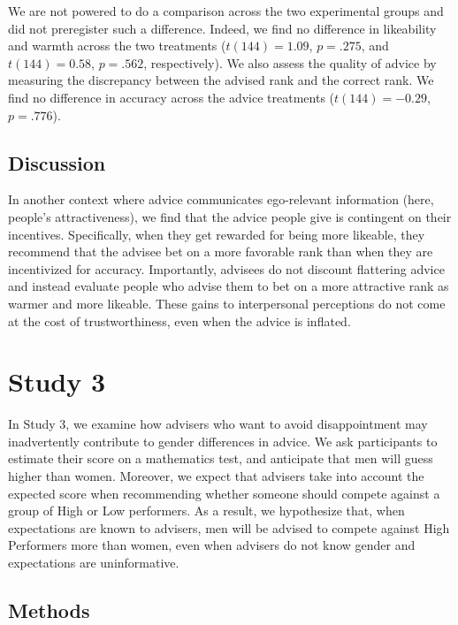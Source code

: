 \documentclass[
  man,
  floatsintext,
  longtable,
  nolmodern,
  notxfonts,
  notimes,
  colorlinks=true,linkcolor=blue,citecolor=blue,urlcolor=blue]{apa7}
\begin{document}
We are not powered to do a comparison across the two experimental groups
and did not preregister such a difference. Indeed, we find no difference
in likeability and warmth across the two treatments (\(t(144) = 1.09\),
\(p = .275\), and \(t(144) = 0.58\), \(p = .562\), respectively). We
also assess the quality of advice by measuring the discrepancy between
the advised rank and the correct rank. We find no difference in accuracy
across the advice treatments (\(t(144) = -0.29\), \(p = .776\)).

\subsection{Discussion}\label{discussion-1}

In another context where advice communicates ego-relevant information
(here, people's attractiveness), we find that the advice people give is
contingent on their incentives. Specifically, when they get rewarded for
being more likeable, they recommend that the advisee bet on a more
favorable rank than when they are incentivized for accuracy.
Importantly, advisees do not discount flattering advice and instead
evaluate people who advise them to bet on a more attractive rank as
warmer and more likeable. These gains to interpersonal perceptions do
not come at the cost of trustworthiness, even when the advice is
inflated.

\section{Study 3}\label{study-3}

In Study 3, we examine how advisers who want to avoid disappointment may
inadvertently contribute to gender differences in advice. We ask
participants to estimate their score on a mathematics test, and
anticipate that men will guess higher than women. Moreover, we expect
that advisers take into account the expected score when recommending
whether someone should compete against a group of High or Low
performers. As a result, we hypothesize that, when expectations are
known to advisers, men will be advised to compete against High
Performers more than women, even when advisers do not know gender and
expectations are uninformative.

\subsection{Methods}\label{methods-2}
\end{document}
